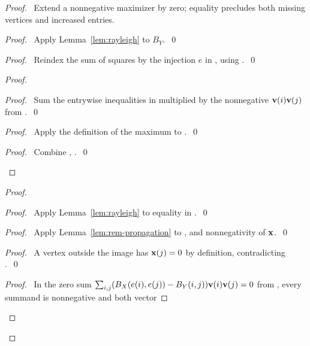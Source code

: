 \begin{proof}
\pfsketch\ Extend a nonnegative maximizer by zero; equality precludes
both missing vertices and increased entries.
\begin{proof}\pf\ Apply Lemma~\ref{lem:rayleigh} to $B_Y$.~\qed\end{proof}
\begin{proof}\pf\ Reindex the sum of squares by the injection $e$ in
, using .~\qed\end{proof}
\begin{proof}
\begin{proof}\pf\ Sum the entrywise inequalities in 
multiplied by the nonnegative ${\mathbf v}(i){\mathbf v}(j)$ from .~\qed\end{proof}
\begin{proof}\pf\ Apply the definition of the maximum to
.~\qed\end{proof}
\qedstep
\begin{proof}\pf\ Combine , .~\qed\end{proof}
\end{proof}
\begin{proof}
\begin{proof}\pf\ Apply Lemma~\ref{lem:rayleigh} to equality in
.~\qed\end{proof}
\begin{proof}\pf\ Apply Lemma~\ref{lem:rem-propagation} to
,  and nonnegativity of ${\mathbf x}$.~\qed\end{proof}
\begin{proof}\pf\ A vertex outside the image has ${\mathbf x}(j)=0$ by definition,
contradicting .~\qed\end{proof}
\begin{proof}\pf\ In the zero sum
$\sum_{i,j}(B_X(e(i),e(j))-B_Y(i,j)){\mathbf v}(i){\mathbf v}(j)=0$
from , every summand is nonnegative and both vector

\end{proof}
\end{proof}
\end{proof}
